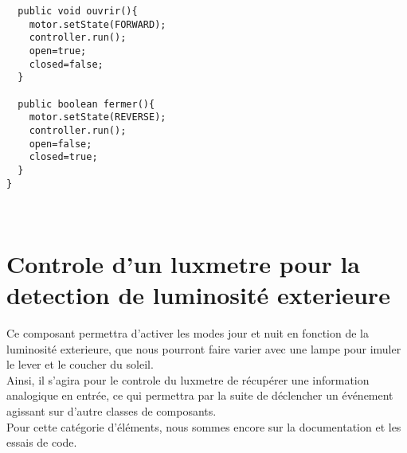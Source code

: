 \documentclass{article}
\newenvironment{DDbox}[1]{
\begin{lrbox}{\BBbox}\begin{minipage}{\linewidth}}
{\end{minipage}\end{lrbox}\noindent\colorbox{Zgris}{\usebox{\BBbox}} \\
[.5cm]}
\begin{document}
\clearpage
\begin{DDbox}{\linewidth}
\begin{lstlisting}
  public void ouvrir(){
    motor.setState(FORWARD);
    controller.run();
    open=true;
    closed=false;
  }
  
  public boolean fermer(){
    motor.setState(REVERSE);
    controller.run();
    open=false;
    closed=true;
  }
}
\end{lstlisting}
\end{DDbox}

\section*{Controle d'un luxmetre pour la detection de luminosité exterieure}
Ce composant permettra d'activer les modes jour et nuit en fonction de la luminosité exterieure, que nous pourront faire varier avec une lampe pour imuler le lever et le coucher du soleil.
\\
Ainsi, il s'agira pour le controle du luxmetre de récupérer une information analogique en entrée, ce qui permettra par la suite de déclencher un événement agissant sur d'autre classes de composants.
\\
Pour cette catégorie d'éléments, nous sommes encore sur la documentation et les essais de code.
\end{document}
